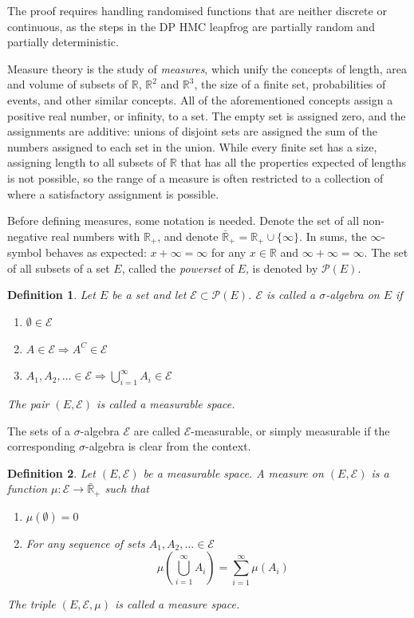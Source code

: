 \documentclass[english,twoside,openright]{HYgraduMLDS}
\newtheorem{definition}{Definition}
\newcommand{\R}{\mathbb{R}}
\begin{document}
The proof requires handling randomised functions that are neither discrete or
continuous, as the steps in the DP HMC leapfrog are partially random and
partially deterministic.

Measure theory is the study of \emph{measures}, which unify the concepts
of length, area and volume of subsets of \(\R\), \(\R^{2}\) and
\(\R^{3}\), the size of a finite set, probabilities of events, and other similar
concepts. All of the aforementioned concepts assign a positive real number,
or infinity, to a set. The empty set is assigned zero, and the assignments are
additive: unions of disjoint sets are assigned the sum of the numbers assigned
to each set in the union. While every finite set has a size, assigning
length to all subsets of \(\R\) that has all the properties expected of lengths
is not possible, so the range of a measure is often restricted to a collection of
where a satisfactory assignment is possible.

Before defining measures, some notation is needed. Denote the set of all
non-negative real numbers with \(\R_{+}\), and denote
\(\bar{\R}_{+} = \R_{+}\cup \{\infty\}\). In sums, the \(\infty\)-symbol
behaves as expected: \(x + \infty = \infty\) for any \(x\in \R\) and
\(\infty + \infty = \infty\). The set of all subsets of a set \(E\), called
the \emph{powerset} of \(E\), is denoted by \(\mathcal{P}(E)\).

\begin{definition}
  Let \(E\) be a set and let \(\mathcal{E}\subset \mathcal{P}(E)\).
  \(\mathcal{E}\) is called a \(\sigma\)-algebra on \(E\) if
  \begin{enumerate}
    \item \(\emptyset \in \mathcal{E}\)
    \item \(A\in \mathcal{E}\Rightarrow A^{C}\in \mathcal{E}\)
    \item \(A_{1},A_{2},\dotsc \in \mathcal{E}
          \Rightarrow \bigcup_{i=1}^{\infty} A_{i}\in \mathcal{E}\)
  \end{enumerate}
  The pair \((E, \mathcal{E})\) is called a measurable space.
\end{definition}
The sets of a \(\sigma\)-algebra \(\mathcal{E}\) are called
\(\mathcal{E}\)-measurable, or simply measurable if the corresponding
\(\sigma\)-algebra is clear from the context.

\begin{definition}
	Let \((E, \mathcal{E})\) be a measurable space. A measure on \((E, \mathcal{E})\)
  is a function \(\mu\colon \mathcal{E}\to \bar{\R}_{+}\) such that
  \begin{enumerate}
    \item
    \(\mu(\emptyset) = 0\)
    \item
    For any sequence of sets \(A_{1}, A_{2},\dotsc \in \mathcal{E}\)
    \[
    \quad \mu\left(\bigcup_{i=1}^{\infty} A_{i}\right)
    = \sum_{i=1}^\infty\mu(A_{i})
    \]
  \end{enumerate}
  The triple \((E, \mathcal{E}, \mu)\) is called a measure space.
\end{definition}
\end{document}
